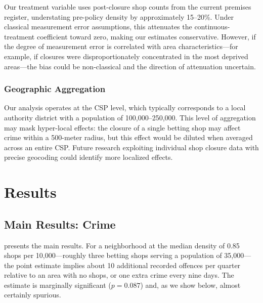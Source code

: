 \documentclass[12pt]{article}
\begin{document}
Our treatment variable uses post-closure shop counts from the current premises register, understating pre-policy density by approximately 15--20\%. Under classical measurement error assumptions, this attenuates the continuous-treatment coefficient toward zero, making our estimates conservative. However, if the degree of measurement error is correlated with area characteristics---for example, if closures were disproportionately concentrated in the most deprived areas---the bias could be non-classical and the direction of attenuation uncertain.

\subsubsection{Geographic Aggregation}

Our analysis operates at the CSP level, which typically corresponds to a local authority district with a population of 100,000--250,000. This level of aggregation may mask hyper-local effects: the closure of a single betting shop may affect crime within a 500-meter radius, but this effect would be diluted when averaged across an entire CSP. Future research exploiting individual shop closure data with precise geocoding could identify more localized effects.


\section{Results}
\label{sec:results}

\subsection{Main Results: Crime}

 presents the main results. For a neighborhood at the median density of 0.85 shops per 10,000---roughly three betting shops serving a population of 35,000---the point estimate implies about 10 additional recorded offences per quarter relative to an area with no shops, or one extra crime every nine days. The estimate is marginally significant ($p = 0.087$) and, as we show below, almost certainly spurious.
\end{document}
